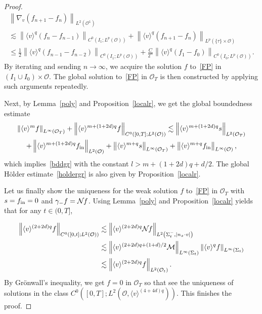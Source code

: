 \documentclass[10pt]{amsart}
\theoremstyle{definition}\newtheorem{defi}[theo]{Definition}\newtheorem{rema}[theo]{Remark}\newtheorem{exam}[theo]{Example}\newtheorem{exem}[theo]{Example}\newtheorem{nota}[theo]{Notation}
\newcommand*\fin {f_{\rm in}}
\newcommand*\M {{\mathcal{M}}}
\newcommand*\NN {{\mathcal{N}\hspace{-.3mm}}}
\newcommand*\OO {\mathcal{O}}
\newcommand{\lv}{\langle v\rangle}
\begin{document}
\begin{proof}
\begin{multline*}
\left\|\nabla_v(f_{n+1}-f_{n})\right\|_{L^2\left(\OO^1\right)} \\
\lesssim \left\|\lv^{q}(f_{n}-f_{n-1})\right\|_{C^0\left(I_1;L^p(\OO)\right)} +\left\|\lv^{q}(f_{n+1}-f_{n})\right\|_{L^p(\{\tau\}\times\OO)} \\
\le \frac{1}{2}\left\|\lv^{q} \left(f_{n-1}-f_{n-2}\right)\right\|_{C^0\left(I_1;L^p(\OO)\right)} + \frac{C}{2^n}\left\|\lv^{q} (f_{1}-f_{0})\right\|_{C^0\left(I_{0};L^p(\OO)\right)} .
\end{multline*}
By iterating and sending $n\rightarrow\infty$, we acquire the solution $f$ to~\eqref{FP} in $(I_1\cup I_0)\times\OO$. The global solution to~\eqref{FP} in $\OO_T$ is then constructed by applying such arguments repeatedly.

Next, by Lemma~\ref{poly} and Proposition~\ref{localr}, we get the global boundedness estimate
\begin{multline*}
\left\|\lv^mf\right\|_{L^\infty(\OO_T)} +\left\|\lv^{m+(1+2d)q}f\right\|_{C^0\left([0,T];L^2(\OO)\right)}
\lesssim \left\|\lv^{m+(1+2d)q}s\right\|_{L^2(\OO_T)}\\
+ \left\|\lv^{m+(1+2d)q}\fin\right\|_{L^2(\OO)} +
\left\|\lv^{m+q}s\right\|_{L^\infty(\OO_T)} + \left\|\lv^{m+q}\fin\right\|_{L^\infty(\OO)},
\end{multline*}
which implies~\eqref{bddgr} with the constant $l>m+(1+2d)q+d/2$. The global H\"older estimate~\eqref{holdergr} is also given by Proposition~\ref{localr}.

Let us finally show the uniqueness for the weak solution $f$ to~\eqref{FP} in $\OO_T$ with $s=\fin=0$ and $\gamma_-f=\NN f$. Using Lemma~\ref{poly} and Proposition~\ref{localr} yields that for any $t\in(0,T]$,

\begin{align*}
\left\|\lv^{(2+2d)q} f\right\|_{C^0\left([0,t];L^2(\OO)\right)}
&\lesssim \left\|\lv^{(2+2d)q}\NN f\right\|_{L^2\left(\Sigma_t^-,|n_x\cdot v|\right)}\\
&\lesssim \left\|\lv^{(2+2d)q+(1+d)/2}\M\right\|_{L^\infty(\Sigma_t)} \left\|\lv^{q}f\right\|_{L^\infty(\Sigma_t)}\\
&\lesssim \left\|\lv^{(2+2d)q} f\right\|_{L^2(\OO_t)}.
\end{align*}
By Gr\"onwall's inequality, we get $f=0$ in $\OO_T$ so that see the uniqueness of solutions in the class $C^0([0,T];L^2(\OO,\lv^{(4+4d)q}))$. This finishes the proof.
\end{proof}
\end{document}
